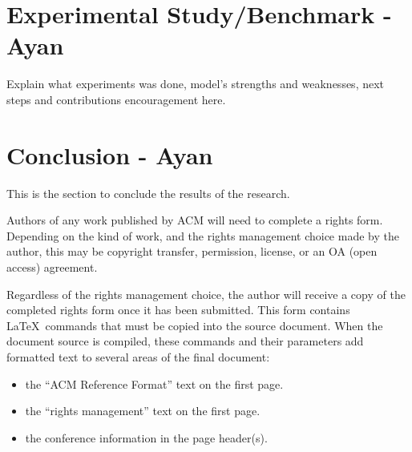 \documentclass[sigconf]{acmart}
\begin{document}



\section{Experimental Study/Benchmark - Ayan}
Explain what experiments was done, model's strengths and weaknesses, next steps and contributions encouragement here.

\section{Conclusion - Ayan}
This is the section to conclude the results of the research.


Authors of any work published by ACM will need to complete a rights
form. Depending on the kind of work, and the rights management choice
made by the author, this may be copyright transfer, permission,
license, or an OA (open access) agreement.

Regardless of the rights management choice, the author will receive a
copy of the completed rights form once it has been submitted. This
form contains \LaTeX\ commands that must be copied into the source
document. When the document source is compiled, these commands and
their parameters add formatted text to several areas of the final
document:
\begin{itemize}
\item the ``ACM Reference Format'' text on the first page.
\item the ``rights management'' text on the first page.
\item the conference information in the page header(s).
\end{itemize}
\end{document}
